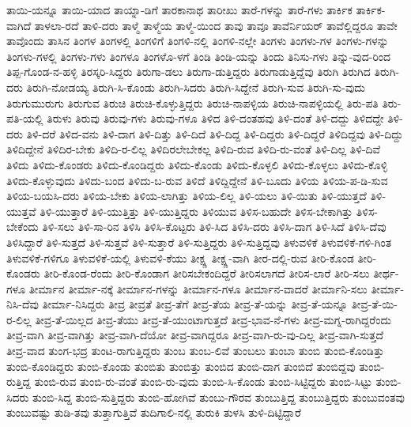 {ತಾಯಿ-ಯನ್ನೂ
ತಾಯಿ-ಯಾದ
ತಾಯ್ನಾ-ಡಿಗೆ
ತಾರಕಾನಾಥ
ತಾರೀಖು
ತಾರೆ-ಗಳನ್ನು
ತಾರೆ-ಗಳು
ತಾರ್ಕಿಕ
ತಾರ್ಕಿಕ-ವಾಗಿದೆ
ತಾಳಲಾ-ರದೆ
ತಾಳಿ-ದರು
ತಾಳ್ಮೆ
ತಾಳ್ಮೆಯ
ತಾಳ್ಮೆ-ಯಿಂದ
ತಾವು
ತಾವೂ
ತಾವೆರ್ನಿಯರ್
ತಾವೆಲ್ಲಿದ್ದರೂ
ತಾವೇ
ತಾವೊಂದು
ತಾಸಿನ
ತಿಂಗಳ
ತಿಂಗಳಲ್ಲಿ
ತಿಂಗಳಿಗೆ
ತಿಂಗಳಿ-ನಲ್ಲಿ
ತಿಂಗಳಿ-ನಲ್ಲೇ
ತಿಂಗಳು
ತಿಂಗಳು-ಗಳ
ತಿಂಗಳು-ಗಳನ್ನು
ತಿಂಗಳು-ಗಳಲ್ಲಿ
ತಿಂಗಳು-ಗಳು
ತಿಂಗಳೂ
ತಿಂಗಳೊ-ಳಗೆ
ತಿಂಡಿ
ತಿಂಡಿ-ಯನ್ನು
ತಿಂದು
ತಿನಿಸು-ಗಳು
ತಿನ್ನು-ವುದ-ರಿಂದ
ತಿಪ್ಪ-ಗೊಂಡ-ನ-ಹಳ್ಳಿ
ತಿರಸ್ಕರಿ-ಸಿದ್ದರು
ತಿರುಗಾ-ಡಲು
ತಿರುಗಾ-ಡುತ್ತಿದ್ದರು
ತಿರುಗಾಡುತ್ತಿದ್ದೆವು
ತಿರುಗಿ
ತಿರುಗಿದ
ತಿರುಗಿ-ದರು
ತಿರುಗಿ-ನೋಡಯ್ಯ
ತಿರುಗಿ-ಸಿ-ಕೊಂಡು
ತಿರುಗಿ-ಸಿದರು
ತಿರುಗಿ-ಸಿದ್ದೇನೆ
ತಿರುಗಿ-ಸುವ
ತಿರುಗಿ-ಸು-ವುದು
ತಿರುಗುಮುರುಗು
ತಿರುಗುವ
ತಿರುಚಿ
ತಿರುಚಿ-ಕೊಳ್ಳುತ್ತಿದ್ದರು
ತಿರುಚಿ-ನಾಪಳ್ಳಿಯ
ತಿರುಚಿ-ನಾಪಳ್ಳಿಯಲ್ಲಿ
ತಿರು-ಪತಿ
ತಿರು-ಪತಿ-ಯಲ್ಲಿ
ತಿರುಳು
ತಿರುವು
ತಿರುವು-ಗಳು
ತಿರುವು-ಗಳೂ
ತಿಳಿದ
ತಿಳಿ-ದಂತಹವು
ತಿಳಿ-ದಂತೆ
ತಿಳಿ-ದದ್ದು
ತಿಳಿದದ್ದೇ
ತಿಳಿ-ದರು
ತಿಳಿ-ದರೆ
ತಿಳಿದ-ವನು
ತಿಳಿ-ದಾಗ
ತಿಳಿ-ದಿತ್ತು
ತಿಳಿ-ದಿದೆ
ತಿಳಿ-ದಿದ್ದ
ತಿಳಿ-ದಿದ್ದರು
ತಿಳಿ-ದಿದ್ದರೆ
ತಿಳಿದಿದ್ದವು
ತಿಳಿ-ದಿದ್ದು
ತಿಳಿದಿದ್ದೇನೆ
ತಿಳಿದಿರ-ಬೇಕು
ತಿಳಿದಿ-ರ-ಲಿಲ್ಲ
ತಿಳಿದಿರಲೇಬೇಕಲ್ಲ
ತಿಳಿದಿ-ರುವ
ತಿಳಿದಿ-ರು-ವಂತೆ
ತಿಳಿ-ದಿಲ್ಲ
ತಿಳಿ-ದಿವೆ
ತಿಳಿದು
ತಿಳಿದು-ಕೊಂಡರು
ತಿಳಿದು-ಕೊಂಡಿದ್ದರು
ತಿಳಿದು-ಕೊಂಡು
ತಿಳಿದು-ಕೊಳ್ಳಲಿ
ತಿಳಿದು-ಕೊಳ್ಳಲು
ತಿಳಿದು-ಕೊಳ್ಳಿ
ತಿಳಿದು-ಕೊಳ್ಳುವುದು
ತಿಳಿದು-ಬಂದ
ತಿಳಿದು-ಬ-ರುವ
ತಿಳಿದೆ
ತಿಳಿದ್ದಿದ್ದೇನೆ
ತಿಳಿ-ಬೂದು
ತಿಳಿಯ
ತಿಳಿಯ-ಪ-ಡಿ-ಸುವ
ತಿಳಿಯ-ಬಯಸಿ-ದರು
ತಿಳಿಯ-ಬೇಕು
ತಿಳಿಯ-ಲಾಗಿತ್ತು
ತಿಳಿಯ-ಲಿಲ್ಲ
ತಿಳಿ-ಯಲು
ತಿಳಿ-ಯಿತು
ತಿಳಿ-ಯುತ್ತದೆ
ತಿಳಿ-ಯುತ್ತವೆ
ತಿಳಿ-ಯುತ್ತಾರೆ
ತಿಳಿ-ಯುತ್ತಿತ್ತು
ತಿಳಿ-ಯುತ್ತಿದ್ದರು
ತಿಳಿಯುವ
ತಿಳಿಸ-ಬಹುದೇ
ತಿಳಿಸ-ಬೇಕಾಗಿತ್ತು
ತಿಳಿಸ-ಬೇಕೆಂದು
ತಿಳಿ-ಸಲು
ತಿಳಿ-ಸಾ-ರಿನ
ತಿಳಿಸಿ
ತಿಳಿಸಿ-ಕೊಟ್ಟರು
ತಿಳಿ-ಸಿದ
ತಿಳಿಸಿ-ದರು
ತಿಳಿಸಿ-ದಾಗ
ತಿಳಿ-ಸಿದೆ
ತಿಳಿಸಿ-ದೆವು
ತಿಳಿಸಿದ್ದಾರೆ
ತಿಳಿ-ಸುತ್ತದೆ
ತಿಳಿ-ಸುತ್ತವೆ
ತಿಳಿ-ಸುತ್ತಾರೆ
ತಿಳಿ-ಸುತ್ತಿದ್ದರು
ತಿಳಿ-ಸುತ್ತಿದ್ದವು
ತಿಳುವಳಿಕೆ
ತಿಳುವಳಿಕೆ-ಗಳಿ-ಗಿಂತ
ತಿಳುವಳಿಕೆ-ಗಳಿಗೂ
ತಿಳುವಳಿಕೆ-ಯಲ್ಲಿ
ತಿಳುವಳಿ-ಕೆಯು
ತೀಕ್ಷ್ಣ
ತೀಕ್ಷ್ಣ-ವಾಗಿ
ತೀರ-ದಲ್ಲಿ-ರುವ
ತೀರಿ-ಕೊಂಡ
ತೀರಿ-ಕೊಂಡರು
ತೀರಿ-ಕೊಂಡ-ರೆಂದು
ತೀರಿ-ಕೊಂಡಾಗ
ತೀರಿಸಬೇಕಂದಿದ್ದರೆ
ತೀರಿಸಲಾಗದೆ
ತೀರಿಸ-ಲಾರೆ
ತೀರಿ-ಸಲು
ತೀರ್ಥ-ಗಳೂ
ತೀರ್ಮಾನ
ತೀರ್ಮಾ-ನಕ್ಕೆ
ತೀರ್ಮಾನ-ಗಳನ್ನು
ತೀರ್ಮಾನ-ಗಳೂ
ತೀರ್ಮಾನ-ವಾದರೆ
ತೀರ್ಮಾನಿ-ಸಲು
ತೀರ್ಮಾ-ನಿಸಿ-ದೆವು
ತೀರ್ಮಾ-ನಿಸಿದ್ದರು
ತೀವ್ರ
ತೀವ್ರತೆ
ತೀವ್ರ-ತೆಗೆ
ತೀವ್ರ-ತೆಯ
ತೀವ್ರ-ತೆ-ಯನ್ನು
ತೀವ್ರ-ತೆ-ಯನ್ನೂ
ತೀವ್ರ-ತೆ-ಯಿ-ರ-ಲಿಲ್ಲ
ತೀವ್ರ-ತೆ-ಯಿಲ್ಲದ
ತೀವ್ರ-ತೆಯು
ತೀವ್ರ-ತೆ-ಯುಂಟಾಗುತ್ತದೆ
ತೀವ್ರ-ಭಾವ-ನೆ-ಗಳು
ತೀವ್ರ-ಮಗ್ನ-ರಾಗಿದ್ದರೆಂದು
ತೀವ್ರ-ವಾಗಿ
ತೀವ್ರ-ವಾಗಿತ್ತು
ತೀವ್ರ-ವಾಗಿ-ದೆಯೋ
ತೀವ್ರ-ವಾಗಿದ್ದರೂ
ತೀವ್ರ-ವಾಗಿ-ರು-ವು-ದಿಲ್ಲ
ತೀವ್ರ-ವಾಗಿ-ಸುತ್ತದೆ
ತೀವ್ರ-ವಾದ
ತುಂಗ-ಭದ್ರ
ತುಂಟ-ರಾಗುತ್ತಿದ್ದರು
ತುಂಬ
ತುಂಬ-ಲಿವೆ
ತುಂಬಲು
ತುಂಬಾ
ತುಂಬಿ
ತುಂಬಿ-ಕೊಂಡಿತ್ತು
ತುಂಬಿ-ಕೊಂಡಿದ್ದರು
ತುಂಬಿ-ಕೊಂಡು
ತುಂಬಿತು
ತುಂಬಿತ್ತು
ತುಂಬಿದ
ತುಂಬಿ-ದಾಗ
ತುಂಬಿದೆ
ತುಂಬಿದ್ದವು
ತುಂಬಿ-ರುತ್ತಿದ್ದ
ತುಂಬಿ-ರುವ
ತುಂಬಿ-ರು-ವಂತೆ
ತುಂಬಿ-ರು-ವುದು
ತುಂಬಿ-ಸಿ-ಕೊಂಡು
ತುಂಬಿ-ಸಿಟ್ಟಿದ್ದರು
ತುಂಬಿ-ಸಿಟ್ಟು
ತುಂಬಿ-ಸಿದರು
ತುಂಬಿ-ಸಿದ್ದ
ತುಂಬಿ-ಸುತ್ತಿದ್ದರು
ತುಂಬಿ-ಹೋಗಿವೆ
ತುಂಬು-ಗೌರವ
ತುಂಬುತ್ತಿದ್ದ
ತುಂಬುತ್ತಿದ್ದರು
ತುಂಬುವಂತವು
ತುಂಬುವಷ್ಟು
ತುಡಿ-ತವು
ತುತ್ತಾಗುತ್ತಿವೆ
ತುದಿಗಾಲಿ-ನಲ್ಲಿ
ತುರುಕಿ
ತುಳಸಿ
ತುಳಿ-ದಿಟ್ಟಿದ್ದಾರೆ
}
